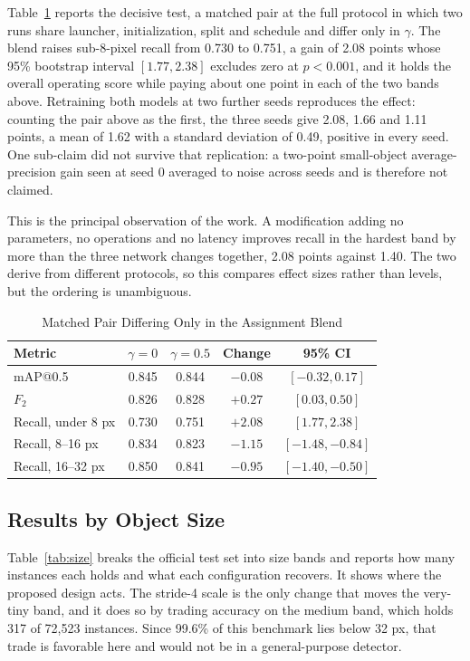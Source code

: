 \documentclass[conference,a4paper]{IEEEtran}
\begin{document}
Table~\ref{tab:assign} reports the decisive test, a matched pair at the full
protocol in which two runs share launcher, initialization, split and schedule
and differ only in $\gamma$. The blend raises sub-8-pixel recall from 0.730 to
0.751, a gain of 2.08 points whose 95\% bootstrap interval $[1.77, 2.38]$
excludes zero at $p < 0.001$, and it holds the overall operating score while
paying about one point in each of the two bands above. Retraining both models at
two further seeds reproduces the effect: counting the pair above as the first,
the three seeds give 2.08, 1.66 and 1.11 points, a mean of 1.62 with a standard
deviation of 0.49, positive in every seed. One sub-claim did not
survive that replication: a two-point small-object average-precision gain seen at
seed 0 averaged to noise across seeds and is therefore not claimed.

This is the principal observation of the work. A modification adding no
parameters, no operations and no latency improves recall in the hardest band by
more than the three network changes together, 2.08 points against 1.40. The two
derive from different protocols, so this compares effect sizes rather than
levels, but the ordering is unambiguous.

\begin{table}[t]
\caption{Matched Pair Differing Only in the Assignment Blend}
\label{tab:assign}
\begin{center}
\small
\setlength{\tabcolsep}{4pt}
\begin{tabular}{|l|c|c|c|c|}
\hline
\textbf{Metric} & $\gamma = 0$ & $\gamma = 0.5$ & \textbf{Change} & \textbf{95\% CI} \\
\hline
mAP@0.5 & 0.845 & 0.844 & $-0.08$ & $[-0.32, 0.17]$ \\
\hline
$F_2$ & 0.826 & 0.828 & $+0.27$ & $[0.03, 0.50]$ \\
\hline
Recall, under 8 px & 0.730 & 0.751 & $\mathbf{+2.08}$ & $[1.77, 2.38]$ \\
\hline
Recall, 8--16 px & 0.834 & 0.823 & $-1.15$ & $[-1.48, -0.84]$ \\
\hline
Recall, 16--32 px & 0.850 & 0.841 & $-0.95$ & $[-1.40, -0.50]$ \\
\hline
\end{tabular}
\end{center}
\end{table}

\subsection{Results by Object Size}
Table~\ref{tab:size} breaks the official test set into size bands and reports
how many instances each holds and what each configuration recovers. It shows
where the proposed design acts. The stride-4 scale is the only change that moves
the very-tiny band, and it does so by trading accuracy on the medium band, which
holds 317 of 72{,}523 instances. Since 99.6\% of this benchmark lies below
32 px, that trade is favorable here and would not be in a general-purpose
detector.
\end{document}
